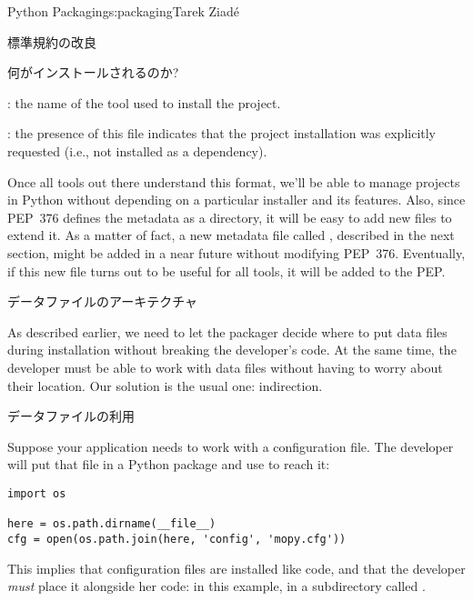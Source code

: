 \begin{aosachapter}{Python Packaging}{s:packaging}{Tarek Ziad\'{e}}
\begin{aosasect1}{標準規約の改良}
\begin{aosasect2}{何がインストールされるのか?}
\begin{aosaitemize}
  \item {}: the name of the tool used to install the
  project.

  \item {}: the presence of this file indicates that the
  project installation was explicitly requested (i.e., not installed
  as a dependency).

\end{aosaitemize}

\noindent
Once all tools out there understand this format, we'll be able to
manage projects in Python without depending on a particular installer
and its features.  Also, since PEP~376 defines the metadata as a
directory, it will be easy to add new files to extend it.  As a matter
of fact, a new metadata file called , described in the
next section, might be added in a near future without modifying
PEP~376. Eventually, if this new file turns out to be useful for all
tools, it will be added to the PEP.

\end{aosasect2}

\begin{aosasect2}{データファイルのアーキテクチャ}

As described earlier, we need to let the packager decide where to put
data files during installation without breaking the developer's
code. At the same time, the developer must be able to work with data
files without having to worry about their location.  Our solution is
the usual one: indirection.

\begin{aosasect3}{データファイルの利用}

Suppose your  application needs to work with a
configuration file.  The developer will put that file in a Python
package and use  to reach it:

\begin{verbatim}
import os

here = os.path.dirname(__file__)
cfg = open(os.path.join(here, 'config', 'mopy.cfg'))
\end{verbatim}

\noindent This implies that configuration files are installed like code, and
that the developer \emph{must} place it alongside her code: in this
example, in a subdirectory called .


\end{aosasect3}
\end{aosasect2}
\end{aosasect1}
\end{aosachapter}
